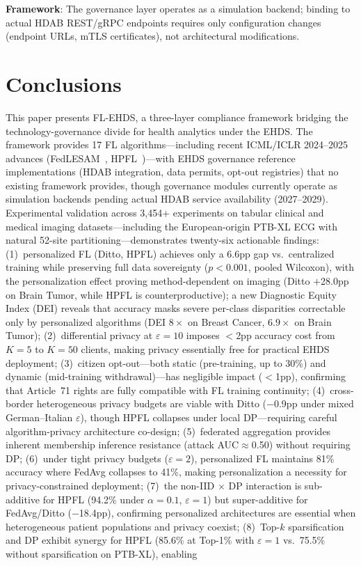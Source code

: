 \documentclass[conference,a4paper]{IEEEtran}
\begin{document}
\textbf{Framework}: The governance layer operates as a simulation backend; binding to actual HDAB REST/gRPC endpoints requires only configuration changes (endpoint URLs, mTLS certificates), not architectural modifications.

\section{Conclusions}
\label{sec:conclusions}

This paper presents FL-EHDS, a three-layer compliance framework bridging the technology-governance divide for health analytics under the EHDS. The framework provides 17 FL algorithms---including recent ICML/ICLR 2024--2025 advances (FedLESAM~\cite{qu2024fedlesam}, HPFL~\cite{chen2025hpfl})---with EHDS governance reference implementations (HDAB integration, data permits, opt-out registries) that no existing framework provides, though governance modules currently operate as simulation backends pending actual HDAB service availability (2027--2029). Experimental validation across 3,454+ experiments on tabular clinical and medical imaging datasets---including the European-origin PTB-XL ECG with natural 52-site partitioning---demonstrates twenty-six actionable findings: (1)~personalized FL (Ditto, HPFL) achieves only a 6.6pp gap vs.\ centralized training while preserving full data sovereignty ($p < 0.001$, pooled Wilcoxon), with the personalization effect proving method-dependent on imaging (Ditto $+$28.0pp on Brain Tumor, while HPFL is counterproductive); a new Diagnostic Equity Index (DEI) reveals that accuracy masks severe per-class disparities correctable only by personalized algorithms (DEI $8\times$ on Breast Cancer, $6.9\times$ on Brain Tumor); (2)~differential privacy at $\varepsilon{=}10$ imposes $<$2pp accuracy cost from $K{=}5$ to $K{=}50$ clients, making privacy essentially free for practical EHDS deployment; (3)~citizen opt-out---both static (pre-training, up to 30\%) and dynamic (mid-training withdrawal)---has negligible impact ($<$1pp), confirming that Article~71 rights are fully compatible with FL training continuity; (4)~cross-border heterogeneous privacy budgets are viable with Ditto ($-$0.9pp under mixed German--Italian $\varepsilon$), though HPFL collapses under local DP---requiring careful algorithm-privacy architecture co-design; (5)~federated aggregation provides inherent membership inference resistance (attack AUC$\approx$0.50) without requiring DP; (6)~under tight privacy budgets ($\varepsilon{=}2$), personalized FL maintains 81\% accuracy where FedAvg collapses to 41\%, making personalization a necessity for privacy-constrained deployment; (7)~the non-IID $\times$ DP interaction is sub-additive for HPFL (94.2\% under $\alpha{=}0.1$, $\varepsilon{=}1$) but super-additive for FedAvg/Ditto ($-$18.4pp), confirming personalized architectures are essential when heterogeneous patient populations and privacy coexist; (8)~Top-$k$ sparsification and DP exhibit synergy for HPFL (85.6\% at Top-1\% with $\varepsilon{=}1$ vs.\ 75.5\% without sparsification on PTB-XL), enabling 
\end{document}

